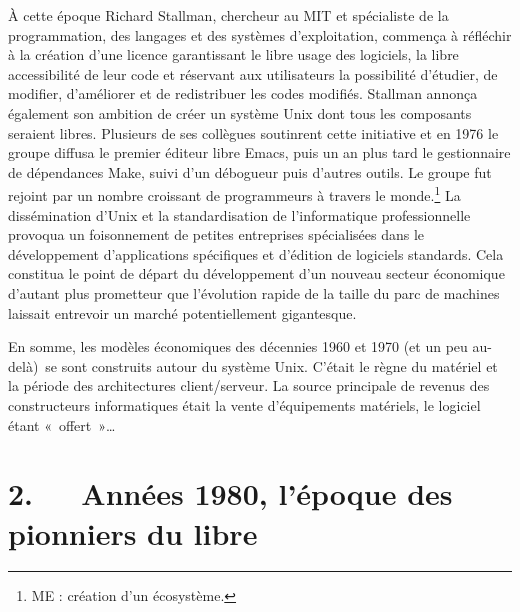 \documentclass{FramateX}
\begin{document}
\begin{refsection}
À cette époque Richard Stallman, chercheur au MIT et spécialiste de la
programmation, des langages et des systèmes
d'exploitation, commença à réfléchir à la création
d'une licence garantissant le libre usage des logiciels, la libre
accessibilité de leur code et réservant aux utilisateurs la possibilité
d'étudier, de modifier, d'améliorer et de redistribuer les codes
modifiés. Stallman annonça également son ambition de créer un système
Unix dont tous les composants seraient libres. Plusieurs de ses
collègues soutinrent cette initiative et en 1976 le groupe diffusa le
premier éditeur libre Emacs, puis un an plus tard le gestionnaire de
dépendances Make, suivi d'un débogueur puis d'autres outils. Le groupe
fut rejoint par un nombre croissant de programmeurs à travers le
monde.\footnote{ME : création d'un écosystème.} La
dissémination d'Unix et la standardisation de l'informatique
professionnelle provoqua un foisonnement de petites entreprises
spécialisées dans le développement d'applications spécifiques et
d'édition de logiciels standards. Cela constitua le point de départ du
développement d'un nouveau secteur économique d'autant plus prometteur
que l'évolution rapide de la taille du parc de machines laissait
entrevoir un marché potentiellement gigantesque.

En somme, les modèles économiques des décennies 1960 et 1970 (et un peu
au-delà)~se sont construits autour du système Unix.
C'était le règne du matériel et la période des
architectures client/serveur. La source principale de revenus des
constructeurs informatiques était la vente
d'équipements matériels, le logiciel étant «~offert~»\ldots

\section*{2.~~~Années 1980, l'époque des pionniers du libre}
{}


\end{refsection}
\end{document}

